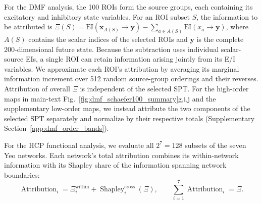 \documentclass[fleqn,10pt]{wlscirep}
\begin{document}
For the DMF analysis, the 100 ROIs form the source groups, each containing its excitatory and inhibitory state variables. For an ROI subset $S$, the information to be attributed is $\Xi(S)=\mathrm{EI}(\boldsymbol{x}_{A(S)}\to\boldsymbol{y})-\sum_{a\in A(S)}\mathrm{EI}(x_a\to\boldsymbol{y})$, where $A(S)$ contains the scalar indices of the selected ROIs and $\boldsymbol{y}$ is the complete 200-dimensional future state. Because the subtraction uses individual scalar-source EIs, a single ROI can retain information arising jointly from its E/I variables. We approximate each ROI's attribution by averaging its marginal information increment over 512 random source-group orderings and their reverses. Attribution of overall $\Xi$ is independent of the selected SPT. For the high-order maps in main-text Fig.~\ref{fig:dmf_schaefer100_summary}g,i,j and the supplementary low-order maps, we instead attribute the two components of the selected SPT separately and normalize by their respective totals (Supplementary Section~\ref{app:dmf_order_bands}).

For the HCP functional analysis, we evaluate all $2^7=128$ subsets of the seven Yeo networks. Each network's total attribution combines its within-network information with its Shapley share of the information spanning network boundaries:
\begin{equation}
\operatorname{Attribution}_{i}
=
\Xi_i^{\mathrm{within}}
+
\operatorname{Shapley}_{i}^{\mathrm{cross}}(\Xi),
\qquad
\sum_{i=1}^{7}\operatorname{Attribution}_{i}=\Xi.
\label{eq:brain_total_shapley_attribution}
\end{equation}
\end{document}
